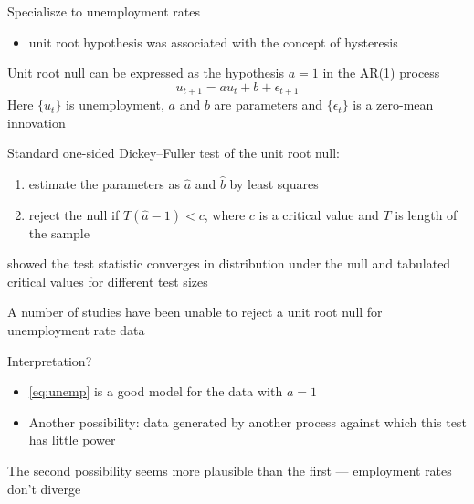\begin{frame}
    
    \vspace{2em}
    Specialisze to unemployment rates 
    \begin{itemize}
        \item unit root hypothesis was associated with the concept of hysteresis
    \end{itemize}
    
    Unit root null can be expressed as the hypothesis $a = 1$ in the AR(1) process
    \begin{equation}
        \label{eq:unemp}
        u_{t+1} = a u_t + b + \epsilon_{t+1}
    \end{equation}
    Here $\{u_t\}$ is unemployment, $a$ and $b$ are parameters and
    $\{\epsilon_t\}$ is a zero-mean innovation
    
\end{frame}

\begin{frame}
    
    \vspace{2em}
    Standard one-sided Dickey--Fuller test of the unit root null:
    \begin{enumerate}
        \item estimate the parameters as $\hat a$ and $\hat b$ by least squares
        \item reject the null if $T (\hat a - 1) < c$, where $c$ is a critical
            value and $T$ is length of the sample
    \end{enumerate}
    
     \cite{dickey1979distribution} showed the
    test statistic converges in distribution under the null and tabulated critical values for
    different test sizes
    
\end{frame}

\begin{frame}
    
    \vspace{2em}
    A number of studies have been unable to reject a unit root null for
    unemployment rate data 
    
    Interpretation?  
    \begin{itemize}
        \item \eqref{eq:unemp} is a good model for the data with $a=1$
        \item Another possibility:
    data generated by another process against which this test has
    little power
    \end{itemize}
    
    The second possibility seems more plausible than the first ---
    employment rates don't diverge
    
\end{frame}

